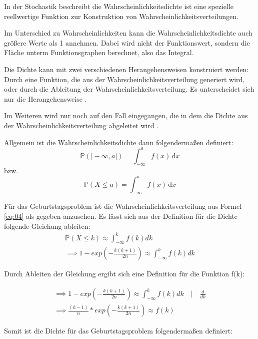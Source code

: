 \documentclass[../main.tex]{subfiles}
\begin{document}
\begin{flushleft}
In der Stochastik beschreibt die Wahrscheinlichkeitsdichte ist eine spezielle reellwertige Funktion zur Konstruktion von Wahrscheinlichkeitsverteilungen.

Im Unterschied zu Wahrscheinlichkeiten kann die Wahrscheinlichkeitsdichte auch größere Werte als 1 annehmen. Dabei wird nicht der Funktionswert, sondern die Fläche unterm Funktionsgraphen berechnet, also das Integral.

Die Dichte kann mit zwei verschiedenen Herangehensweisen konstruiert werden: Durch eine Funktion, die aus der Wahrscheinlichkeitsverteilung generiert wird, oder durch die Ableitung der Wahrscheinlichkeitsverteilung. Es unterscheidet sich nur die Herangehensweise  \cite[560ff]{henze}. 

Im Weiteren wird nur noch auf den Fall eingegangen, die in dem die Dichte aus der Wahrscheinlichkeitsverteilung abgeleitet wird  \cite[22ff]{georgii}. \newline

Allgemein ist die Wahrscheinlichkeitsdichte dann folgendermaßen definiert:
\begin{equation}
\mathbb{P}(]-\infty, a])= \int_{-\infty}^a f(x) \, \mathrm d x
\end{equation}
bzw.
\begin{equation}
\mathbb{P}(X \leq a)= \int_{-\infty}^a f(x) \,\mathrm d x
\end{equation}

Für das Geburtstagsproblem ist die Wahrscheinlichkeitsverteilung aus Formel \ref{eq:04} als gegeben anzusehen. Es lässt sich aus der Definition für die Dichte folgende Gleichung ableiten:
\begin{eqnarray}
\mathbb{P}(X \leq k) \approx \int_{ -\infty }^{ k }{ f(k) dk } \\
\implies 1 - exp( - \frac{ k (k + 1) }{ 2n } ) \approx \int_{ -\infty }^{ k }{ f(k) dk }
\end{eqnarray}

Durch Ableiten der Gleichung ergibt sich eine Definition für die Funktion f(k):

\begin{eqnarray}
\implies 1 - exp( - \frac{ k (k + 1) }{ 2n } ) \approx \int_{ -\infty }^{ k }{ f(k) dk } \quad | \quad \frac{ d }{ dk }\\
\implies \frac{ (k-1) }{ n } * exp( - \frac{ k (k + 1) }{ 2n } ) \approx f(k)
\end{eqnarray}

Somit ist die Dichte für das Geburtstagsproblem folgendermaßen definiert:


\end{flushleft}
\end{document}
